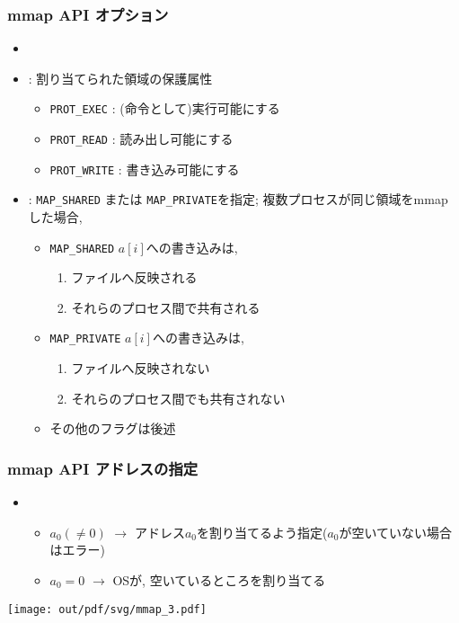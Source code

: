\documentclass[12pt,dvipdfmx]{beamer}
\begin{document}
\begin{frame}
  \frametitle{mmap API オプション}
  \begin{itemize}
  \item {}
  \item {} : 割り当てられた領域の保護属性
    \begin{itemize}
    \item {\tt PROT\_EXEC} : (命令として)実行可能にする
    \item {\tt PROT\_READ} : 読み出し可能にする
    \item {\tt PROT\_WRITE} : 書き込み可能にする
    \end{itemize}
    
  \item {} : {\tt MAP\_SHARED} または {\tt MAP\_PRIVATE}を指定;
    複数プロセスが同じ領域をmmapした場合,
    \begin{itemize}
    \item {\tt MAP\_SHARED}
      $a[i]$への書き込みは, 
      \begin{enumerate}
      \item ファイルへ反映される
      \item それらのプロセス間で共有される
      \end{enumerate}
    \item {\tt MAP\_PRIVATE}
      $a[i]$への書き込みは, 
      \begin{enumerate}
      \item ファイルへ反映されない
      \item それらのプロセス間でも共有されない
      \end{enumerate}
    \item その他のフラグは後述
    \end{itemize}
  \end{itemize}
\end{frame}

\begin{frame}
  \frametitle{mmap API アドレスの指定}
  \begin{itemize}
  \item {}
    \begin{itemize}
    \item $a_0 (\neq 0)$ $\rightarrow$
      アドレス$a_0$を割り当てるよう指定($a_0$が空いていない場合はエラー)
    \item $a_0 = 0$ $\rightarrow$
      OSが, 空いているところを割り当てる
    \end{itemize}
  \end{itemize}
  \begin{center}
    \texttt{[image: out/pdf/svg/mmap\_3.pdf]}
  \end{center}
\end{frame}
\end{document}

